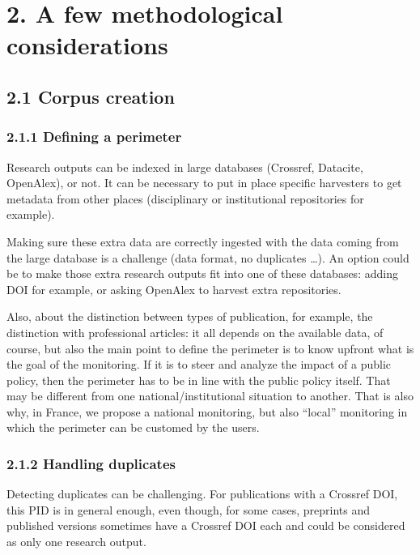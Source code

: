 \documentclass[
]{article}
\begin{document}
\hypertarget{a-few-methodological-considerations}{%
\section{2. A few methodological
considerations}\label{a-few-methodological-considerations}}

\hypertarget{corpus-creation}{%
\subsection{2.1 Corpus creation}\label{corpus-creation}}

\hypertarget{defining-a-perimeter}{%
\subsubsection{2.1.1 Defining a perimeter}\label{defining-a-perimeter}}

Research outputs can be indexed in large databases (Crossref, Datacite,
OpenAlex), or not. It can be necessary to put in place specific
harvesters to get metadata from other places (disciplinary or
institutional repositories for example).

Making sure these extra data are correctly ingested with the data coming
from the large database is a challenge (data format, no duplicates
\ldots). An option could be to make those extra research outputs fit
into one of these databases: adding DOI for example, or asking OpenAlex
to harvest extra repositories.

Also, about the distinction between types of publication, for example,
the distinction with professional articles: it all depends on the
available data, of course, but also the main point to define the
perimeter is to know upfront what is the goal of the monitoring. If it
is to steer and analyze the impact of a public policy, then the
perimeter has to be in line with the public policy itself. That may be
different from one national/institutional situation to another. That is
also why, in France, we propose a national monitoring, but also
``local'' monitoring in which the perimeter can be customed by the
users.

\hypertarget{handling-duplicates}{%
\subsubsection{2.1.2 Handling duplicates}\label{handling-duplicates}}

Detecting duplicates can be challenging. For publications with a
Crossref DOI, this PID is in general enough, even though, for some
cases, preprints and published versions sometimes have a Crossref DOI
each and could be considered as only one research output.
\end{document}
